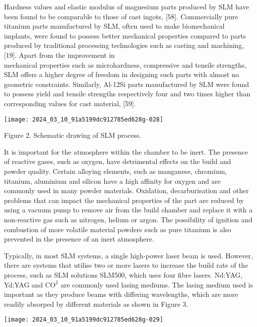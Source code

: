 \documentclass[10pt]{article}
\begin{document}
Hardness values and elastic modulus of magnesium parts produced by SLM have been found to be comparable to those of cast ingots, [58]. Commercially pure titanium parts manufactured by SLM, often used to make biomechanical implants, were found to possess better mechanical properties compared to parts produced by traditional processing technologies such as casting and machining, [19]. Apart from the improvement in\\
mechanical properties such as microhardness, compressive and tensile strengths, SLM offers a higher degree of freedom in designing such parts with almost no geometric constraints. Similarly, Al-12Si parts manufactured by SLM were found to possess yield and tensile strengths respectively four and two times higher than corresponding values for cast material, [59].

\begin{center}
\texttt{[image: 2024\_03\_10\_91a5199dc912785ed628g-028]}
\end{center}

Figure 2. Schematic drawing of SLM process.

It is important for the atmosphere within the chamber to be inert. The presence of reactive gases, such as oxygen, have detrimental effects on the build and powder quality. Certain alloying elements, such as manganese, chromium, titanium, aluminium and silicon have a high affinity for oxygen and are commonly used in many powder materials. Oxidation, decarburisation and other problems that can impact the mechanical properties of the part are reduced by using a vacuum pump to remove air from the build chamber and replace it with a non-reactive gas such as nitrogen, helium or argon. The possibility of ignition and\\
combustion of more volatile material powders such as pure titanium is also prevented in the presence of an inert atmosphere.

Typically, in most SLM systems, a single high-power laser beam is used. However, there are systems that utilise two or more lasers to increase the build rate of the process, such as SLM solutions SLM500, which uses four fibre lasers. Nd:YAG, Yd:YAG and $\mathrm{CO}^{2}$ are commonly used lasing mediums. The lasing medium used is important as they produce beams with differing wavelengths, which are more readily absorped by different materials as shown in Figure 3.

\begin{center}
\texttt{[image: 2024\_03\_10\_91a5199dc912785ed628g-029]}
\end{center}
\end{document}
